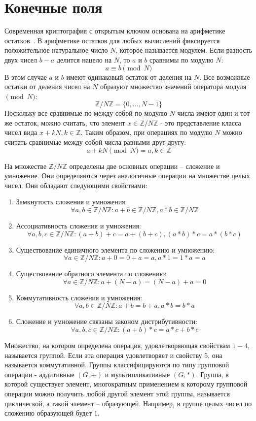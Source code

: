 \documentclass[times,specification,annotation]{itmo-student-thesis}
\begin{document}
\section{Конечные поля}\label{sec:fields}

Современная криптография с открытым ключом основана на арифметике остатков~\cite{sma15, men01, knu97_2}.
В арифметике остатков для любых вычислений фиксируется положительное натуральное число $N$, которое называется модулем.
Если разность двух чисел $b-a$ делится нацело на $N$, то $a$ и $b$ сравнимы по модулю $N$:
\[a \equiv b \pmod{N}\]
В этом случае $a$ и $b$ имеют одинаковый остаток от деления на $N$.
Все возможные остатки от деления чисел на $N$ образуют множество значений оператора модуля $\pmod{N}$:
\[\mathbb{Z}/N\mathbb{Z}=\{0,\dots,N-1\}\]
Поскольку все сравнимые по между собой по модулю $N$ числа имеют один и тот же остаток, можно считать, что
элемент $x\in\mathbb{Z}/N\mathbb{Z}$ - это представление класса чисел вида $x+kN, k\in\mathbb{Z}$.
Таким образом, при операциях по модулю $N$ можно считать сравнимые между собой числа равными друг другу:
\[a+kN\pmod{N} = a, k \in \mathbb{Z}\]


На множестве $\mathbb{Z}/N\mathbb{Z}$ определены две основных операции -- сложение и умножение.
Они определяются через аналогичные операции на множестве целых чисел.
Они обладают следующими свойствами:
\begin{enumerate}[label=\arabic*.]
    \item Замкнутость сложения и умножения:
    \[\forall a, b \in \mathbb{Z}/N\mathbb{Z}: a+b\in \mathbb{Z}/N\mathbb{Z}, a*b\in \mathbb{Z}/N\mathbb{Z}\]
    \item Ассоциативность сложения и умножения:
    \[\forall a, b, c \in \mathbb{Z}/N\mathbb{Z}: (a+b)+c = a+(b+c), (a*b)*c = a*(b*c)\]
    \item Существование единичного элемента по сложению и умножению:
    \[\forall a \in \mathbb{Z}/N\mathbb{Z}: a+0 = 0+a = a, a*1 = 1*a = a\]
    \item Существование обратного элемента по сложению:
    \[\forall a \in \mathbb{Z}/N\mathbb{Z}: a+(N-a) = (N-a)+a = 0\]
    \item Коммутативность сложения и умножения:
    \[\forall a, b \in \mathbb{Z}/N\mathbb{Z}: a+b = b+a, a*b = b*a\]
    \item Сложение и умножение связаны законом дистрибутивности:
    \[\forall a, b, c \in \mathbb{Z}/N\mathbb{Z}: (a+b)*c = a*c + b*c\]
\end{enumerate}
Множество, на котором определена операция, удовлетворяющая свойствам $1-4$, называется группой.
Если эта операция удовлетворяет и свойству $5$, она называется коммутативной.
Группы классифицируются по типу групповой операции - аддитивные $(G, +)$ и мультипликативные $(G,*)$.
Группа, в которой существует элемент, многократным применением к которому групповой операции можно получить
любой другой элемент этой группы, называется циклической, а такой элемент -- образующей.
Например, в группе целых чисел по сложению образующей будет $1$.
\end{document}
